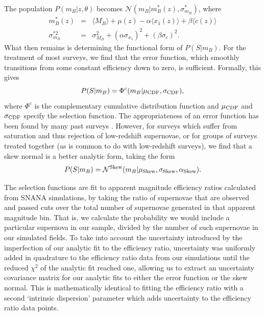 \documentclass[a4paper,fleqn,usenatbib,manuscript]{emulateapj}
\begin{document}
The population $P(m_B | z, \theta)$ becomes $\mathcal{N}(m_B|m_B^*(z), \sigma^*_{m_B})$, where
\begin{eqnarray}
m_B^*(z) &=& \langle M_B \rangle + \mu(z) - \alpha \langle x_1(z) \rangle + \beta \langle c(z) \rangle \\
\sigma^{*2}_{m_B} &=& \sigma_{M_B}^2 + (\alpha \sigma_{x_1})^2 + (\beta \sigma_c)^2.
\end{eqnarray}
What then remains is determining the functional form of $P(S|m_B)$. For the treatment of most surveys, we find that the error function, which smoothly transitions from some constant efficiency down to zero, is sufficient. Formally, this gives
\begin{equation}
P(S|m_B) = \Phi^c(m_B | \mu_{\rm CDF}, \sigma_{\rm CDF}),
\end{equation}
where $\Phi^c$ is the complementary cumulative distribution function and $\mu_{\rm CDF}$ and $\sigma_{\rm CDF}$ specify the selection function. The appropriateness of an error function has been found by many past surveys \citep{Dilday2008, Barbary2010, Perrett2012, Graur2013, Rodney2014}. However, for surveys which suffer from saturation and thus rejection of low-redshift supernovae, or for groups of surveys treated together (as is common to do with low-redshift surveys), we find that a skew normal is a better analytic form, taking the form
\begin{equation}
P(S|m_B) = \mathcal{N}^{{\rm Skew}}(m_B | \mu_{\rm Skew}, \sigma_{\rm Skew}, \alpha_{\rm Skew}).
\end{equation}

The selection functions are fit to apparent magnitude efficiency ratios calculated from SNANA simulations, by taking the ratio of supernovae that are observed and passed cuts over the total number of supernovae generated in that apparent magnitude bin. That is, we calculate the probability we would include a particular supernova in our sample, divided by the number of such supernovae in our simulated fields. To take into account the uncertainty introduced by the imperfection of our analytic fit to the efficiency ratio, uncertainty was uniformly added in quadrature to the efficiency ratio data from our simulations until the reduced $\chi^2$ of the analytic fit reached one, allowing us to extract an uncertainty covariance matrix for our analytic fits to either the error function or the skew normal. This is mathematically identical to fitting the efficiency ratio with a second `intrinsic dispersion' parameter which adds uncertainty to the efficiency ratio data points.
\end{document}
